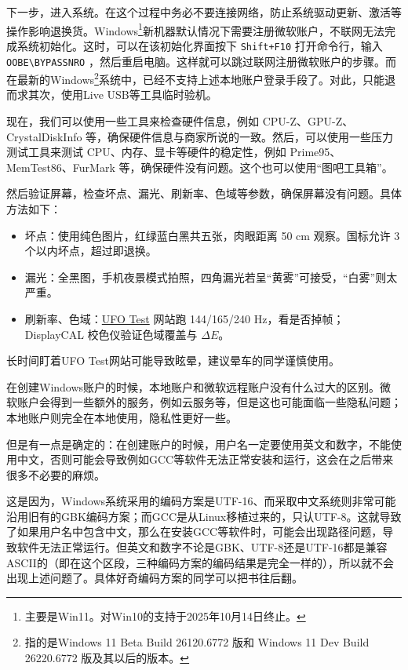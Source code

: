 下一步，进入系统。在这个过程中务必不要连接网络，防止系统驱动更新、激活等操作影响退换货。Windows\footnote{主要是Win11。对Win10的支持于2025年10月14日终止。}新机器默认情况下需要注册微软账户，不联网无法完成系统初始化。这时，可以在该初始化界面按下 \texttt{Shift+F10} 打开命令行，输入 \verb|OOBE\BYPASSNRO| ，然后重启电脑。这样就可以跳过联网注册微软账户的步骤。而在最新的Windows\footnote{指的是Windows 11 Beta Build 26120.6772 版和 Windows 11 Dev Build 26220.6772 版及其以后的版本。}系统中，已经不支持上述本地账户登录手段了。对此，只能退而求其次，使用Live USB等工具临时验机。

现在，我们可以使用一些工具来检查硬件信息，例如 CPU-Z、GPU-Z、CrystalDiskInfo 等，确保硬件信息与商家所说的一致。然后，可以使用一些压力测试工具来测试 CPU、内存、显卡等硬件的稳定性，例如 Prime95、MemTest86、FurMark 等，确保硬件没有问题。这个也可以使用“图吧工具箱”。

然后验证屏幕，检查坏点、漏光、刷新率、色域等参数，确保屏幕没有问题。具体方法如下：
\begin{itemize}
  \item 坏点：使用纯色图片，红绿蓝白黑共五张，肉眼距离 50 cm 观察。国标允许 3 个以内坏点，超过即退换。
  \item 漏光：全黑图，手机夜景模式拍照，四角漏光若呈“黄雾”可接受，“白雾”则太严重。
  \item 刷新率、色域：\href{https://www.testufo.com/}{UFO Test} 网站跑 144/165/240 Hz，看是否掉帧；DisplayCAL 校色仪验证色域覆盖与 $\Delta E$。
\end{itemize}

\begin{caution}
  长时间盯着UFO Test网站可能导致眩晕，建议晕车的同学谨慎使用。
\end{caution}

\begin{caution}
在创建Windows账户的时候，本地账户和微软远程账户没有什么过大的区别。微软账户会得到一些额外的服务，例如云服务等，但是这也可能面临一些隐私问题；本地账户则完全在本地使用，隐私性更好一些。

但是有一点是确定的：在创建账户的时候，用户名一定要使用英文和数字，不能使用中文，否则可能会导致例如GCC等软件无法正常安装和运行，这会在之后带来很多不必要的麻烦。

这是因为，Windows系统采用的编码方案是UTF-16、而采取中文系统则非常可能沿用旧有的GBK编码方案；而GCC是从Linux移植过来的，只认UTF-8。这就导致了如果用户名中包含中文，那么在安装GCC等软件时，可能会出现路径问题，导致软件无法正常运行。但英文和数字不论是GBK、UTF-8还是UTF-16都是兼容ASCII的（即在这个区段，三种编码方案的编码结果是完全一样的），所以就不会出现上述问题了。具体好奇编码方案的同学可以把书往后翻。
\end{caution}

